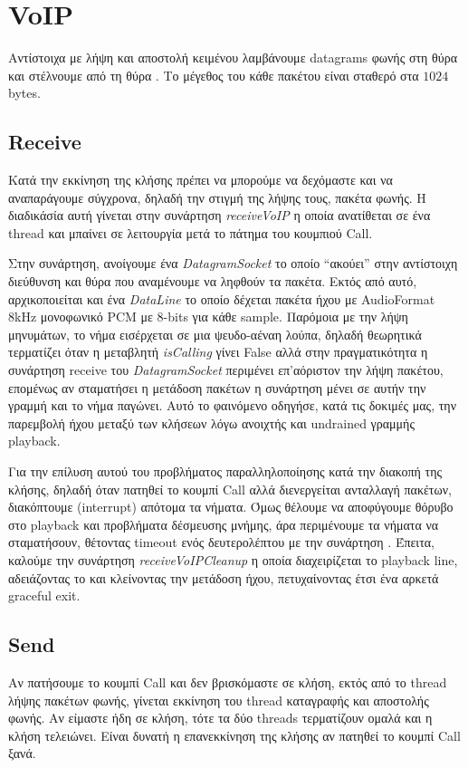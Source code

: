 \documentclass{article}
\begin{document}
\section{VoIP}
Αντίστοιχα με λήψη και αποστολή κειμένου λαμβάνουμε datagrams φωνής στη θύρα \voicedestport{} και 
στέλνουμε από τη θύρα \voicesrcport. Το μέγεθος του κάθε πακέτου είναι σταθερό στα $1024$ bytes.
\subsection{Receive}
Κατά την εκκίνηση της κλήσης πρέπει να μπορούμε να δεχόμαστε και να αναπαράγουμε σύγχρονα, δηλαδή την στιγμή της
λήψης τους, πακέτα φωνής. Η διαδικάσία αυτή γίνεται στην συνάρτηση \textit{receiveVoIP} η οποία ανατίθεται σε ένα
thread και μπαίνει σε λειτουργία μετά το πάτημα του κουμπιού Call. 

Στην συνάρτηση, ανοίγουμε ένα \textit{DatagramSocket} το οποίο ``ακούει'' στην αντίστοιχη διεύθυνση και θύρα που
αναμένουμε να ληφθούν τα πακέτα. Εκτός από αυτό, αρχικοποιείται και ένα \textit{DataLine} το οποίο δέχεται πακέτα
ήχου με AudioFormat 8kHz μονοφωνικό PCM με 8-bits για κάθε sample. Παρόμοια με την λήψη μηνυμάτων, το νήμα εισέρχεται
σε μια ψευδο-αέναη λούπα, δηλαδή θεωρητικά τερματίζει όταν η μεταβλητή \textit{isCalling} γίνει False αλλά στην
πραγματικότητα η συνάρτηση receive του \textit{DatagramSocket} περιμένει επ'αόριστον την λήψη πακέτου, επομένως
αν σταματήσει η μετάδοση πακέτων η συνάρτηση μένει σε αυτήν την γραμμή και το νήμα παγώνει. Αυτό το φαινόμενο
οδηγήσε, κατά τις δοκιμές μας, την παρεμβολή ήχου μεταξύ των κλήσεων λόγω ανοιχτής και undrained γραμμής playback.

Για την επίλυση αυτού του προβλήματος παραλληλοποίησης κατά την διακοπή της κλήσης, δηλαδή όταν πατηθεί το κουμπί
Call αλλά διενεργείται ανταλλαγή πακέτων, διακόπτουμε (interrupt) απότομα τα νήματα.
Όμως θέλουμε να αποφύγουμε θόρυβο στο playback και προβλήματα δέσμευσης μνήμης, άρα περιμένουμε τα νήματα να σταματήσουν,
θέτοντας timeout  ενός δευτερολέπτου με την συνάρτηση . Έπειτα, καλούμε 
την συνάρτηση \textit{receiveVoIPCleanup} η οποία διαχειρίζεται το playback line, αδειάζοντας το και κλείνοντας την 
μετάδοση ήχου, πετυχαίνοντας έτσι ένα αρκετά graceful exit. 

\subsection{Send}
Aν πατήσουμε το κουμπί Call και δεν βρισκόμαστε σε κλήση, 
εκτός από το thread λήψης πακέτων φωνής, γίνεται εκκίνηση του thread καταγραφής και αποστολής φωνής.
Αν είμαστε ήδη σε κλήση, τότε τα δύο threads τερματίζουν ομαλά και η κλήση τελειώνει. Είναι δυνατή
η επανεκκίνηση της κλήσης αν πατηθεί το κουμπί Call ξανά.
\end{document}
